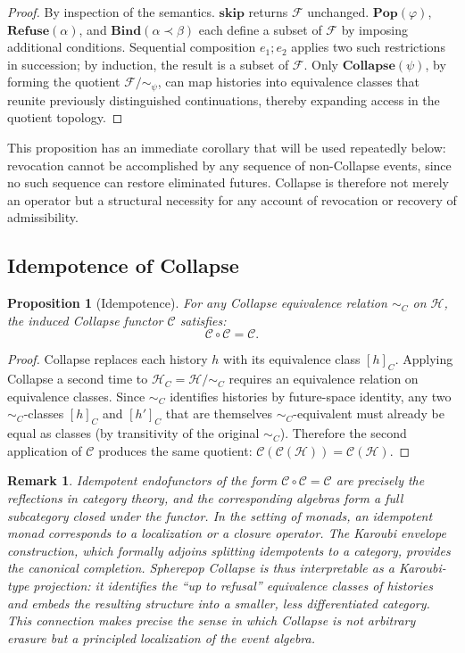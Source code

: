 \documentclass[11pt]{article}
\newtheorem{proposition}{Proposition}
\newtheorem{remark}{Remark}
\newcommand{\Future}{\mathcal{F}}
\begin{document}
\begin{proof}
By inspection of the semantics. $\mathbf{skip}$ returns $\Future$ unchanged.
$\mathbf{Pop}(\varphi)$, $\mathbf{Refuse}(\alpha)$, and
$\mathbf{Bind}(\alpha \prec \beta)$ each define a subset of $\Future$ by
imposing additional conditions. Sequential composition $e_1 ; e_2$ applies two
such restrictions in succession; by induction, the result is a subset of
$\Future$. Only $\mathbf{Collapse}(\psi)$, by forming the quotient
$\Future / \sim_\psi$, can map histories into equivalence classes that reunite
previously distinguished continuations, thereby expanding access in the quotient
topology.
\end{proof}

This proposition has an immediate corollary that will be used repeatedly below:
revocation cannot be accomplished by any sequence of non-Collapse events, since
no such sequence can restore eliminated futures. Collapse is therefore not merely
an operator but a structural necessity for any account of revocation or recovery
of admissibility.

\subsection{Idempotence of Collapse}

\begin{proposition}[Idempotence]
\label{prop:idempotent}
For any Collapse equivalence relation $\sim_C$ on $\mathcal{H}$, the induced
Collapse functor $\mathcal{C}$ satisfies:
\[
\mathcal{C} \circ \mathcal{C} = \mathcal{C}.
\]
\end{proposition}

\begin{proof}
Collapse replaces each history $h$ with its equivalence class $[h]_C$. Applying
Collapse a second time to $\mathcal{H}_C = \mathcal{H}/\sim_C$ requires an
equivalence relation on equivalence classes. Since $\sim_C$ identifies histories
by future-space identity, any two $\sim_C$-classes $[h]_C$ and $[h']_C$ that
are themselves $\sim_C$-equivalent must already be equal as classes
(by transitivity of the original $\sim_C$). Therefore the second application of
$\mathcal{C}$ produces the same quotient: $\mathcal{C}(\mathcal{C}(\mathcal{H}))
= \mathcal{C}(\mathcal{H})$.
\end{proof}

\begin{remark}
Idempotent endofunctors of the form $\mathcal{C} \circ \mathcal{C} = \mathcal{C}$
are precisely the reflections in category theory, and the corresponding algebras
form a full subcategory closed under the functor. In the setting of monads, an
idempotent monad corresponds to a localization or a closure operator. The
Karoubi envelope construction, which formally adjoins splitting idempotents to a
category, provides the canonical completion. Spherepop Collapse is thus
interpretable as a Karoubi-type projection: it identifies the ``up to refusal''
equivalence classes of histories and embeds the resulting structure into a
smaller, less differentiated category. This connection makes precise the sense in
which Collapse is not arbitrary erasure but a principled localization of the
event algebra.
\end{remark}
\end{document}
